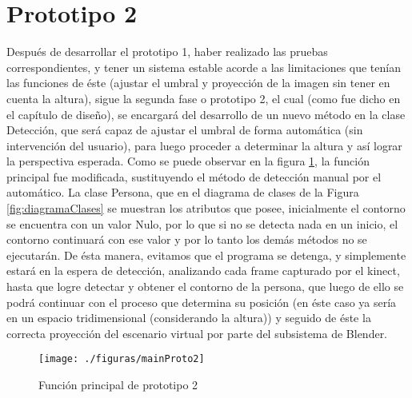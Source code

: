 \documentclass[a4paper,openright,12pt]{report}
\begin{document}
\section{Prototipo 2}
Después de desarrollar el prototipo 1, haber realizado las pruebas correspondientes, y tener un sistema estable acorde a las limitaciones que tenían las funciones de éste (ajustar el umbral y proyección de la imagen sin tener en cuenta la altura), sigue la segunda fase o prototipo 2, el cual (como fue dicho en el capítulo de diseño), se encargará del desarrollo de un nuevo método en la clase Detección, que será capaz de ajustar el umbral de forma automática (sin intervención del usuario), para luego proceder a determinar la altura y así lograr la perspectiva esperada. Como se puede observar en la figura \ref{fig:mainProto2}, la función principal fue modificada, sustituyendo el método de detección manual por el automático. La clase Persona, que en el diagrama de clases de la Figura \ref{fig:diagramaClases} se muestran los atributos que posee, inicialmente el contorno se encuentra con un valor Nulo, por lo que si no se detecta nada en un inicio, el contorno continuará con ese valor y por lo tanto los demás métodos no se ejecutarán. De ésta manera, evitamos que el programa se detenga, y simplemente estará en la espera de detección, analizando cada frame capturado por el kinect\textcopyright, hasta que logre detectar y obtener el contorno de la persona, que luego de ello se podrá continuar con el proceso que determina su posición (en éste caso ya sería en un espacio tridimensional (considerando la altura)) y seguido de éste la correcta proyección del escenario virtual por parte del subsistema de Blender.
\begin{figure}[thb]
	\centering
	\texttt{[image: ./figuras/mainProto2]}
	\caption{Función principal de prototipo 2} 
	\label{fig:mainProto2}
\end{figure}
\end{document}
